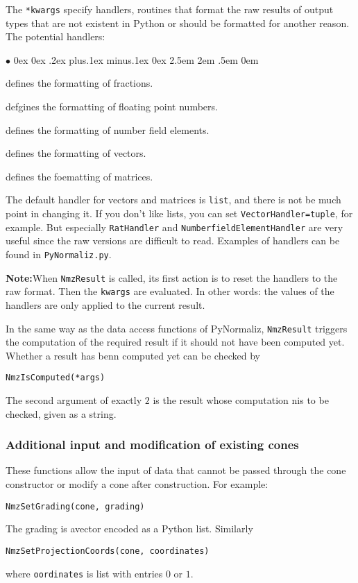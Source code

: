 \documentclass[12pt,a4paper]{scrartcl}
\newcommand{\stdli}{ \topsep0ex \partopsep0ex %
\parsep.2ex plus.1ex minus.1ex \itemsep0ex%
\leftmargin2.5em \labelwidth2em \labelsep.5em \rightmargin0em}%
\renewenvironment{itemize}{\begin{list}{{$\bullet$}}{\stdli}}{\end{list}}
\theoremstyle{definition}
\def\itemtt[#1]{\item[\textbf{\ttt{#1}}]}
\def\ttt{\texttt}
\begin{document}
\begin{small}
The \verb|*kwargs| specify handlers, routines that format the raw results of  output types that are not existent in Python or should be formatted for another reason. The potential handlers:
\begin{itemize}
	\itemtt[RatHandler] defines the formatting of fractions.
	
	\itemtt[FloatHandler] defgines the formatting of floating point numbers.
	
	\itemtt[NumberfieldElementHandler] defines the formatting of number field elements.
	
	\itemtt[VectorHandler] defines the formatting of vectors.
	
	\itemtt[MatrixHandler] defines the foematting of matrices.
\end{itemize}

The default handler for vectors and matrices is \verb|list|, and there is not be much point in changing it. If you don't like lists, you can set \verb|VectorHandler=tuple|, for example.  But especially \verb|RatHandler| and \verb|NumberfieldElementHandler| are very useful since the raw versions are difficult to read. Examples of handlers can be found in  \verb|PyNormaliz.py|. 

\textbf{Note:}\enspace When \verb|NmzResult| is called, its first action is to reset the handlers to the raw format. Then the \verb|kwargs| are evaluated. In other words:  the values of the handlers are only applied to the current result.

In the same way as the data access functions of PyNormaliz, \verb|NmzResult| triggers the computation of the required result if it should not have been computed yet. Whether a result has benn computed yet can be checked by
\begin{Verbatim}
NmzIsComputed(*args)
\end{Verbatim}
The second argument of exactly $2$ is the result whose computation nis to be checked, given as a string.

\subsubsection{Additional input and modification of existing cones}

These functions allow the input of data that cannot be passed through the cone constructor or modify a cone after construction. For example:
\begin{Verbatim}
NmzSetGrading(cone, grading)
\end{Verbatim}
The grading is avector encoded as a Python list. Similarly
\begin{Verbatim}
NmzSetProjectionCoords(cone, coordinates)
\end{Verbatim}
where \verb|oordinates|  is list with entries $0$ or $1$.


\end{small}
\end{document}
